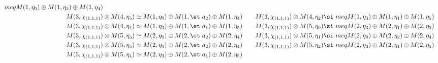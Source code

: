 \begin{align*}
meq M(1,\eta_{0}) \oplus M(1,\eta_{2}) \oplus M(1,\eta_{4})\\
M(3,\chi_{(1,1,1)}) &\otimes M(4,\eta_{5}) \simeq M(1,\eta_{0}) \oplus M(1,\et\
a_{2}) \oplus M(1,\eta_{4}) &&& M(3,\chi_{(1,1,1)}) &\otimes M(4,\eta_{2}) \si\
meq M(1,\eta_{3}) \oplus M(1,\eta_{1}) \oplus M(1,\eta_{5})\\
M(3,\chi_{(1,1,1)}) &\otimes M(4,\eta_{4}) \simeq M(1,\eta_{3}) \oplus M(1,\et\
a_{1}) \oplus M(1,\eta_{5}) &&& M(3,\chi_{(1,1,1)}) &\otimes M(5,\eta_{0}) \si\
meq M(2,\eta_{3}) \oplus M(2,\eta_{1}) \oplus M(2,\eta_{5})\\
M(3,\chi_{(1,1,1)}) &\otimes M(5,\eta_{3}) \simeq M(2,\eta_{0}) \oplus M(2,\et\
a_{2}) \oplus M(2,\eta_{4}) &&& M(3,\chi_{(1,1,1)}) &\otimes M(5,\eta_{1}) \si\
meq M(2,\eta_{0}) \oplus M(2,\eta_{2}) \oplus M(2,\eta_{4})\\
M(3,\chi_{(1,1,1)}) &\otimes M(5,\eta_{5}) \simeq M(2,\eta_{0}) \oplus M(2,\et\
a_{2}) \oplus M(2,\eta_{4}) &&& M(3,\chi_{(1,1,1)}) &\otimes M(5,\eta_{2}) \si\
meq M(2,\eta_{3}) \oplus M(2,\eta_{1}) \oplus M(2,\eta_{5})\\
M(3,\chi_{(1,1,1)}) &\otimes M(5,\eta_{4}) \simeq M(2,\eta_{3}) \oplus M(2,\et\
a_{1}) \oplus M(2,\eta_{5})\\
\end{align*}


